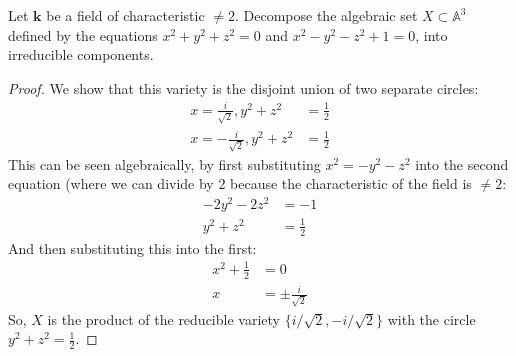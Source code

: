 \documentclass[12pt]{article}
\theoremstyle{definition}
\newenvironment{problem}[2][Problem]{\begin{trivlist}
\item[\hskip \labelsep {\bfseries #1}\hskip \labelsep {\bfseries #2.}]}{\end{trivlist}}
\begin{document}
\begin{problem}{4}
Let $\mathbf{k}$ be a field of characteristic $\neq 2$. Decompose the algebraic set $X \subset \mathbb A^3$ defined by the equations $x^2 + y^2 +z^2 = 0$ and $x^2 - y^2 - z^2 + 1 = 0$, into irreducible components.
\begin{proof}
We show that this variety is the disjoint union of two separate circles:
\begin{align*}
x = \frac{i}{\sqrt{2}}, y^2 + z^2 &= \frac{1}{2}\\
x = -\frac{i}{\sqrt{2}}, y^2 + z^2 &= \frac{1}{2}
\end{align*}
This can be seen algebraically, by first substituting $x^2 = -y^2 - z^2$ into the second equation (where we can divide by $2$ because the characteristic of the field is $\neq 2$:
\begin{align*}
-2y^2 - 2z^2 &= -1\\
y^2 + z^2 &= \frac{1}{2}
\end{align*}
And then substituting this into the first:
\begin{align*}
    x^2 + \frac{1}{2} &= 0\\
    x &= \pm \frac{i}{\sqrt{2}}
\end{align*}
So, $X$ is the product of the reducible variety $\{i/\sqrt{2}, -i/\sqrt{2}\}$ with the circle $y^2 + z^2 = \frac{1}{2}$.
\end{proof}
\end{problem}
\end{document}
